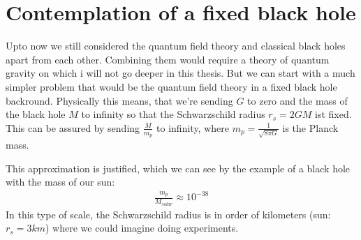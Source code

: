 \section{Contemplation of a fixed black hole}

Upto now we still considered the quantum field theory and classical black holes apart from each other. Combining them would require a theory of quantum gravity on which i will not go deeper in this thesis. But we can start with a much simpler problem that would be the quantum field theory in a fixed black hole backround. Physically this means, that we're sending $G$ to zero and the mass of the black hole $M$ to infinity so that the Schwarzschild radius $r_s = 2GM$ ist fixed. This can be assured by sending $\frac{M}{m_p}$ to infinity, where $m_p =\frac{1}{\sqrt{8\pi G}}$ is the Planck mass. 

This approximation is justified, which we can see by the example of a black hole with the mass of our sun:
	\begin{align}
		\frac{m_p}{M_{solar}} \approx 10^{-38}
	\end{align}	 
In this type of scale, the Schwarzschild radius is in order of kilometers (sun: $r_s=3 \unit{km}$) where we could imagine doing experiments. 

